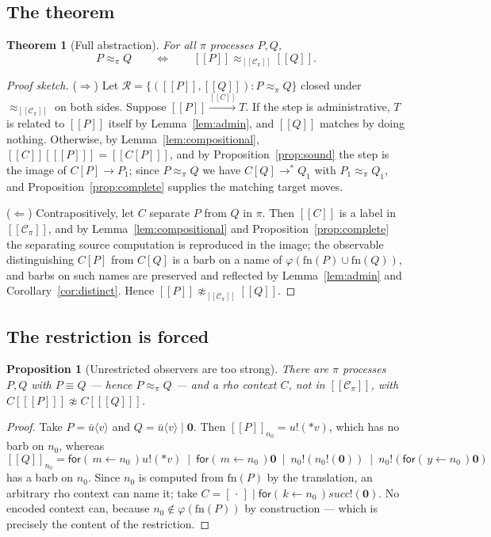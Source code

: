 \documentclass[11pt]{article}
\theoremstyle{definition}
\theoremstyle{plain}
\newtheorem{proposition}[definition]{Proposition}
\newtheorem{theorem}[definition]{Theorem}
\theoremstyle{remark}
\newcommand{\drp}[1]{{*}#1}
\newcommand{\inp}[3]{\mathsf{for}(\,#1 \leftarrow #2\,)#3}
\newcommand{\out}[2]{#1!(#2)}
\newcommand{\enc}[1]{[\![#1]\!]}
\newcommand{\nil}{\mathbf{0}}
\newcommand{\Ctx}{\mathscr{C}}
\newcommand{\bisim}{\approx}
\newcommand{\fn}{\mathrm{fn}}
\begin{document}
\subsection{The theorem}

\begin{theorem}[Full abstraction]\label{thm:fullabs}
For all $\pi$ processes $P, Q$,
\[
  P \bisim_\pi Q
  \qquad\Longleftrightarrow\qquad
  \enc{P} \bisim_{\enc{\Ctx_\pi}} \enc{Q}.
\]
\end{theorem}

\begin{proof}[Proof sketch]
($\Rightarrow$) Let $\mathcal{R} = \{(\enc{P}, \enc{Q}) : P \bisim_\pi Q\}$
closed under $\bisim_{\enc{\Ctx_\pi}}$ on both sides. Suppose
$\enc{P} \xrightarrow{\enc{C}} T$. If the step is administrative, $T$ is
related to $\enc{P}$ itself by Lemma~\ref{lem:admin}, and $\enc{Q}$ matches
by doing nothing. Otherwise, by Lemma~\ref{lem:compositional},
$\enc{C}[\enc{P}] = \enc{C[P]}$, and by Proposition~\ref{prop:sound} the
step is the image of $C[P] \to P_1$; since $P \bisim_\pi Q$ we have
$C[Q] \to^* Q_1$ with $P_1 \bisim_\pi Q_1$, and
Proposition~\ref{prop:complete} supplies the matching target moves.

($\Leftarrow$) Contrapositively, let $C$ separate $P$ from $Q$ in $\pi$.
Then $\enc{C}$ is a label in $\enc{\Ctx_\pi}$, and by
Lemma~\ref{lem:compositional} and Proposition~\ref{prop:complete} the
separating source computation is reproduced in the image; the observable
distinguishing $C[P]$ from $C[Q]$ is a barb on a name of
$\varphi(\fn(P) \cup \fn(Q))$, and barbs on such names are preserved and
reflected by Lemma~\ref{lem:admin} and
Corollary~\ref{cor:distinct}. Hence $\enc{P} \not\bisim_{\enc{\Ctx_\pi}} \enc{Q}$.
\end{proof}

\subsection{The restriction is forced}\label{sec:necessity}

\begin{proposition}[Unrestricted observers are too strong]
\label{prop:necessity}
There are $\pi$ processes $P, Q$ with $P \equiv Q$ --- hence
$P \bisim_\pi Q$ --- and a rho context $C$, not in $\enc{\Ctx_\pi}$, with
$C[\enc{P}] \not\bisim C[\enc{Q}]$.
\end{proposition}

\begin{proof}
Take $P = \bar u\langle v\rangle$ and $Q = \bar u\langle v\rangle \mid \nil$.
Then $\enc{P}_{n_0} = \out{u}{\drp{v}}$, which has no barb on $n_0$,
whereas
\[
\enc{Q}_{n_0} =
  \inp{m}{n_0}{\out{u}{\drp{v}}} \ \mid\ \inp{m}{n_0}{\nil}
  \ \mid\ \out{n_0}{\out{n_0}{\nil}} \ \mid\ \out{n_0}{\inp{y}{n_0}{\nil}}
\]
has a barb on $n_0$. Since $n_0$ is computed from $\fn(P)$ by the
translation, an arbitrary rho context can name it; take
$C = [\,\cdot\,] \mid \inp{k}{n_0}{\out{\mathit{succ}}{\nil}}$. No
encoded context can, because $n_0 \notin \varphi(\fn(P))$ by construction
--- which is precisely the content of the restriction.
\end{proof}
\end{document}
